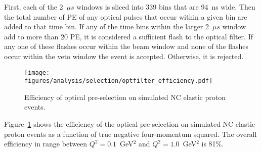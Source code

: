     First, each of the 2~$\mu s$ windows is sliced into 339 bins that are
    94~ns wide. Then the total number of PE of any optical pulses that
    occur within a given bin are added to that time bin. If any of the time
    bins within the larger 2~$\mu s$ window add to more than 20 PE, it is
    considered a sufficient flash to the optical filter. If any one of these
    flashes occur within the beam window and none of the flashes occur within
    the veto window the event is accepted. Otherwise, it is rejected.
    \begin{figure}[ht]
      \centering
      \texttt{[image: figures/analysis/selection/optfilter\_efficiency.pdf]}
      \caption{Efficiency of optical pre-selection on simulated NC elastic
        proton events.}
      \label{fig:opfiltereff}
    \end{figure}

    Figure~\ref{fig:opfiltereff} shows the efficiency of the optical
    pre-selection on simulated NC elastic proton events as a function of true
    negative four-momentum squared. The overall efficiency in range between
    $Q^2 = 0.1$~GeV$^2$ and $Q^2 = 1.0$~GeV$^2$ is 81\%.

